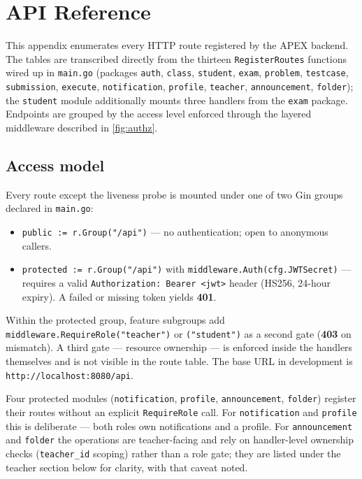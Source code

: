 \chapter{API Reference}\label{ch:ap-a}

This appendix enumerates every HTTP route registered by the APEX backend. The tables are transcribed directly from the thirteen \texttt{RegisterRoutes} functions wired up in \texttt{main.go} (packages \texttt{auth}, \texttt{class}, \texttt{student}, \texttt{exam}, \texttt{problem}, \texttt{testcase}, \texttt{submission}, \texttt{execute}, \texttt{notification}, \texttt{profile}, \texttt{teacher}, \texttt{announcement}, \texttt{folder}); the \texttt{student} module additionally mounts three handlers from the \texttt{exam} package. Endpoints are grouped by the access level enforced through the layered middleware described in \cref{fig:authz}.

\section{Access model}

Every route except the liveness probe is mounted under one of two Gin groups declared in \texttt{main.go}:

\begin{itemize}[nosep]
  \item \texttt{public := r.Group("/api")} --- no authentication; open to anonymous callers.
  \item \texttt{protected := r.Group("/api")} with \texttt{middleware.Auth(cfg.JWTSecret)} --- requires a valid \texttt{Authorization: Bearer <jwt>} header (HS256, 24-hour expiry). A failed or missing token yields \textbf{401}.
\end{itemize}

Within the protected group, feature subgroups add \texttt{middleware.RequireRole("teacher")} or \texttt{("student")} as a second gate (\textbf{403} on mismatch). A third gate --- resource ownership --- is enforced inside the handlers themselves and is not visible in the route table. The base URL in development is \texttt{http://localhost:8080/api}.

Four protected modules (\texttt{notification}, \texttt{profile}, \texttt{announcement}, \texttt{folder}) register their routes without an explicit \texttt{RequireRole} call. For \texttt{notification} and \texttt{profile} this is deliberate --- both roles own notifications and a profile. For \texttt{announcement} and \texttt{folder} the operations are teacher-facing and rely on handler-level ownership checks (\texttt{teacher\_id} scoping) rather than a role gate; they are listed under the teacher section below for clarity, with that caveat noted.

